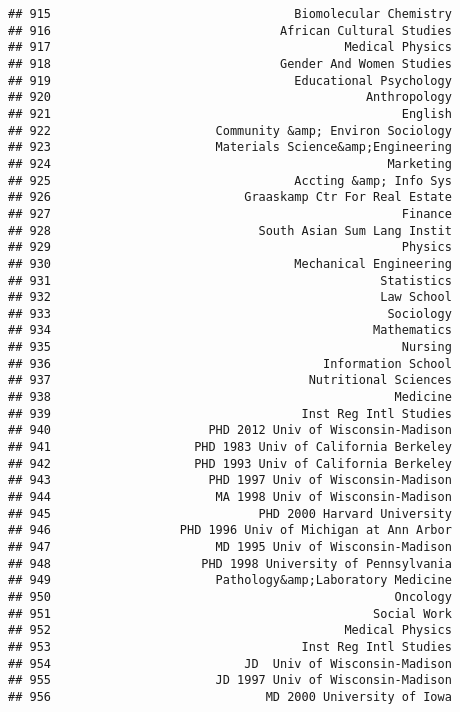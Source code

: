 \documentclass[
]{article}
\begin{document}
\begin{verbatim}
## 915                                  Biomolecular Chemistry
## 916                                African Cultural Studies
## 917                                         Medical Physics
## 918                                Gender And Women Studies
## 919                                  Educational Psychology
## 920                                            Anthropology
## 921                                                 English
## 922                       Community &amp; Environ Sociology
## 923                       Materials Science&amp;Engineering
## 924                                               Marketing
## 925                                  Accting &amp; Info Sys
## 926                           Graaskamp Ctr For Real Estate
## 927                                                 Finance
## 928                             South Asian Sum Lang Instit
## 929                                                 Physics
## 930                                  Mechanical Engineering
## 931                                              Statistics
## 932                                              Law School
## 933                                               Sociology
## 934                                             Mathematics
## 935                                                 Nursing
## 936                                      Information School
## 937                                    Nutritional Sciences
## 938                                                Medicine
## 939                                   Inst Reg Intl Studies
## 940                      PHD 2012 Univ of Wisconsin-Madison
## 941                    PHD 1983 Univ of California Berkeley
## 942                    PHD 1993 Univ of California Berkeley
## 943                      PHD 1997 Univ of Wisconsin-Madison
## 944                       MA 1998 Univ of Wisconsin-Madison
## 945                             PHD 2000 Harvard University
## 946                  PHD 1996 Univ of Michigan at Ann Arbor
## 947                       MD 1995 Univ of Wisconsin-Madison
## 948                     PHD 1998 University of Pennsylvania
## 949                       Pathology&amp;Laboratory Medicine
## 950                                                Oncology
## 951                                             Social Work
## 952                                         Medical Physics
## 953                                   Inst Reg Intl Studies
## 954                           JD  Univ of Wisconsin-Madison
## 955                       JD 1997 Univ of Wisconsin-Madison
## 956                              MD 2000 University of Iowa

\end{verbatim}
\end{document}
